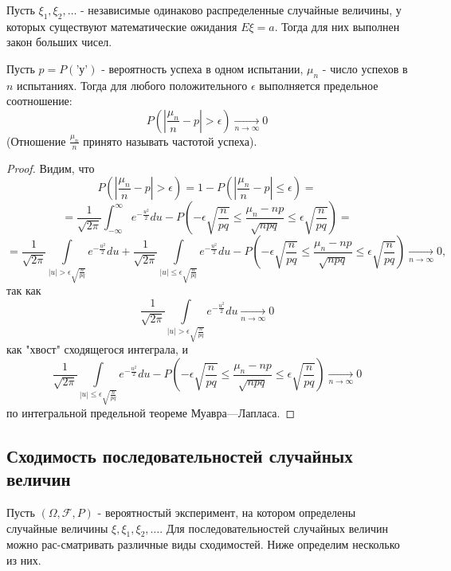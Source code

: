 \begin{theorem}
	Пусть $\xi_1, \xi_2, \dots$ - независимые одинаково распределенные случайные величины, у которых существуют математические ожидания $E\xi = a$. Тогда для них выполнен закон больших чисел.
\end{theorem}

\begin{theorem}
	Пусть $p = P(\text{'у'})$ - вероятность успеха в одном испытании, $\mu_n$ - число успехов в $n$ испытаниях. Тогда для любого положительного $\epsilon$ выполняется предельное соотношение:
	\[ P \left( \left| \frac{\mu_n}{n} - p \right| > \epsilon \right) \underset{n \to \infty}{\to} 0 \]
	(Отношение $\frac{\mu_n}{n}$ принято называть частотой успеха).
	\begin{proof}
		Видим, что
		\[ P \left( \left| \frac{\mu_n}{n} - p \right| > \epsilon \right) = 1 - P \left( \left| \frac{\mu_n}{n} - p \right| \le \epsilon \right) = \]
		\[ = \frac{1}{\sqrt{2 \pi}} \int_{- \infty}^{\infty} e^{-\frac{u^2}{2}} du - P \left( - \epsilon \sqrt{\frac{n}{pq}} \le \frac{\mu_n - np}{\sqrt{npq}} \le \epsilon \sqrt{\frac{n}{pq}} \right) = \]
		\[ = \frac{1}{\sqrt{2 \pi}} \int\limits_{|u| > \epsilon \sqrt{\frac{n}{pq}}} e^{-\frac{u^2}{2}} du + \frac{1}{\sqrt{2 \pi}} \int\limits_{|u| \le \epsilon \sqrt{\frac{n}{pq}}} e^{- \frac{u^2}{2}} du - P \left( - \epsilon \sqrt{\frac{n}{pq}} \le \frac{\mu_n - np}{\sqrt{npq}} \le \epsilon \sqrt{\frac{n}{pq}} \right) \underset{n \to \infty}{\to} 0, \]
		так как
		\[ \frac{1}{\sqrt{2 \pi}} \int\limits_{|u| > \epsilon \sqrt{\frac{n}{pq}}} e^{- \frac{u^2}{2}} du \underset{n \to \infty}{\to} 0 \]
		как "хвост" сходящегося интеграла, и
		\[ \frac{1}{\sqrt{2 \pi}} \int\limits_{|u| \le \epsilon \sqrt{\frac{n}{pq}}} e^{- \frac{u^2}{2}} du - P \left( - \epsilon \sqrt{\frac{n}{pq}} \le \frac{\mu_n - np}{\sqrt{npq}} \le \epsilon \sqrt{\frac{n}{pq}} \right) \underset{n \to \infty}{\to} 0 \]
		по интегральной предельной теореме Муавра—Лапласа.
	\end{proof}
\end{theorem}

\subsection{Сходимость последовательностей случайных величин}

Пусть $(\Omega, \mathcal{F}, P)$ - вероятностый эксперимент, на котором определены случайные величины $\xi, \xi_1, \xi_2, \dots$. Для последовательностей случайных величин можно рас-сматривать различные виды сходимостей. Ниже определим несколько из них.

